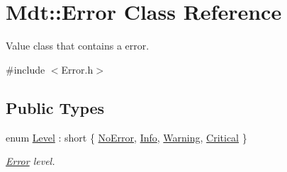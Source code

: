 \hypertarget{class_mdt_1_1_error}{}\section{Mdt\+:\+:Error Class Reference}
\label{class_mdt_1_1_error}


Value class that contains a error.  




{\ttfamily \#include $<$Error.\+h$>$}

\subsection*{Public Types}
\begin{DoxyCompactItemize}
\item 
enum \hyperlink{class_mdt_1_1_error_ab533dc690f68a8635232db594194a068}{Level} \+: short \{ \hyperlink{class_mdt_1_1_error_ab533dc690f68a8635232db594194a068a1f0076cc77af5bed268bcef0c88969de}{No\+Error}, 
\hyperlink{class_mdt_1_1_error_ab533dc690f68a8635232db594194a068a6cf5d2017767cf4086ebb2d245d42f11}{Info}, 
\hyperlink{class_mdt_1_1_error_ab533dc690f68a8635232db594194a068a6b9dbb52e31678b806f4ecf1ae23d2ab}{Warning}, 
\hyperlink{class_mdt_1_1_error_ab533dc690f68a8635232db594194a068a6d4d123a2a43721c206c455a721567b6}{Critical}
 \}\begin{DoxyCompactList}\small\item\em \hyperlink{class_mdt_1_1_error}{Error} level. \end{DoxyCompactList}
\end{DoxyCompactItemize}
